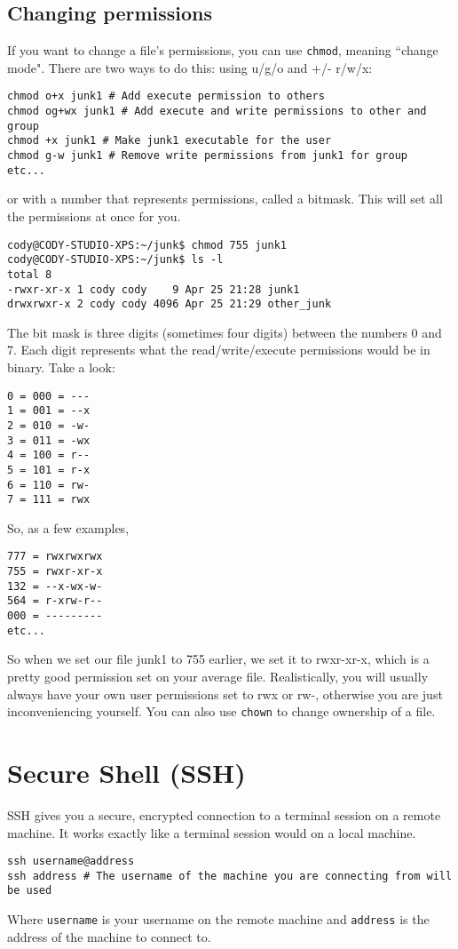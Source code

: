 \documentclass{article}
\begin{document}
\subsection{Changing permissions}
If you want to change a file's permissions, you can use \texttt{chmod}, meaning ``change mode". There are two ways to do this: using u/g/o and +/- r/w/x:
\begin{verbatim}
chmod o+x junk1 # Add execute permission to others
chmod og+wx junk1 # Add execute and write permissions to other and group
chmod +x junk1 # Make junk1 executable for the user
chmod g-w junk1 # Remove write permissions from junk1 for group
etc...
\end{verbatim}
or with a number that represents permissions, called a bitmask. This will set all the permissions at once for you.
\begin{verbatim}
cody@CODY-STUDIO-XPS:~/junk$ chmod 755 junk1
cody@CODY-STUDIO-XPS:~/junk$ ls -l
total 8
-rwxr-xr-x 1 cody cody    9 Apr 25 21:28 junk1
drwxrwxr-x 2 cody cody 4096 Apr 25 21:29 other_junk
\end{verbatim}
The bit mask is three digits (sometimes four digits) between the numbers 0 and 7. Each digit represents what the read/write/execute permissions would be in binary. Take a look:
\begin{verbatim}
0 = 000 = --- 
1 = 001 = --x
2 = 010 = -w-
3 = 011 = -wx
4 = 100 = r--
5 = 101 = r-x
6 = 110 = rw-
7 = 111 = rwx
\end{verbatim}
So, as a few examples,
\begin{verbatim}
777 = rwxrwxrwx
755 = rwxr-xr-x
132 = --x-wx-w-
564 = r-xrw-r--
000 = ---------
etc...
\end{verbatim}
So when we set our file junk1 to 755 earlier, we set it to rwxr-xr-x, which is a pretty good permission set on your average file. Realistically, you will usually always have your own user permissions set to rwx or rw-, otherwise you are just inconveniencing yourself. You can also use \texttt{chown} to change ownership of a file.

\section{Secure Shell (SSH)}
SSH gives you a secure, encrypted connection to a terminal session on a remote machine. It works exactly like a terminal session would on a local machine. 
\begin{verbatim}
ssh username@address
ssh address # The username of the machine you are connecting from will be used
\end{verbatim}
Where \texttt{username} is your username on the remote machine and \texttt{address} is the address of the machine to connect to. 
\end{document}
